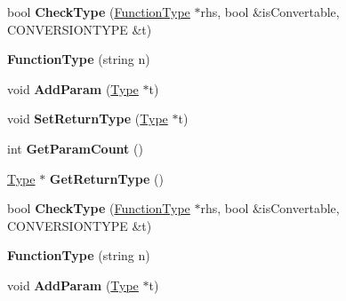\begin{DoxyCompactItemize}
\item 
\hypertarget{classFunctionType_a150840d05c02a26ca776aad22e0deed1}{bool {\bfseries Check\-Type} (\hyperlink{classFunctionType}{Function\-Type} $\ast$rhs, bool \&is\-Convertable, C\-O\-N\-V\-E\-R\-S\-I\-O\-N\-T\-Y\-P\-E \&t)}\label{classFunctionType_a150840d05c02a26ca776aad22e0deed1}

\item 
\hypertarget{classFunctionType_a924981ea6fc18a7a9ed4cb5c94a136d6}{{\bfseries Function\-Type} (string n)}\label{classFunctionType_a924981ea6fc18a7a9ed4cb5c94a136d6}

\item 
\hypertarget{classFunctionType_a9259c94250b6cb903c6013bc10a0b7bc}{void {\bfseries Add\-Param} (\hyperlink{classType}{Type} $\ast$t)}\label{classFunctionType_a9259c94250b6cb903c6013bc10a0b7bc}

\item 
\hypertarget{classFunctionType_a1462775c5732b70b07c689ab7088814d}{void {\bfseries Set\-Return\-Type} (\hyperlink{classType}{Type} $\ast$t)}\label{classFunctionType_a1462775c5732b70b07c689ab7088814d}

\item 
\hypertarget{classFunctionType_a8b6fed7ff4d79b5db3d39cd042326090}{int {\bfseries Get\-Param\-Count} ()}\label{classFunctionType_a8b6fed7ff4d79b5db3d39cd042326090}

\item 
\hypertarget{classFunctionType_a601e763553086c0d7a4c2de97d6de2bc}{\hyperlink{classType}{Type} $\ast$ {\bfseries Get\-Return\-Type} ()}\label{classFunctionType_a601e763553086c0d7a4c2de97d6de2bc}

\item 
\hypertarget{classFunctionType_a150840d05c02a26ca776aad22e0deed1}{bool {\bfseries Check\-Type} (\hyperlink{classFunctionType}{Function\-Type} $\ast$rhs, bool \&is\-Convertable, C\-O\-N\-V\-E\-R\-S\-I\-O\-N\-T\-Y\-P\-E \&t)}\label{classFunctionType_a150840d05c02a26ca776aad22e0deed1}

\item 
\hypertarget{classFunctionType_a924981ea6fc18a7a9ed4cb5c94a136d6}{{\bfseries Function\-Type} (string n)}\label{classFunctionType_a924981ea6fc18a7a9ed4cb5c94a136d6}

\item 
\hypertarget{classFunctionType_a9259c94250b6cb903c6013bc10a0b7bc}{void {\bfseries Add\-Param} (\hyperlink{classType}{Type} $\ast$t)}\label{classFunctionType_a9259c94250b6cb903c6013bc10a0b7bc}


\end{DoxyCompactItemize}
